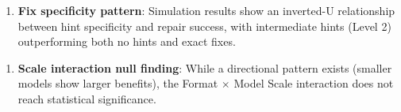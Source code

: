 \begin{enumerate}
\item \textbf{Fix specificity pattern}: Simulation results show an inverted-U relationship between hint specificity and repair success, with intermediate hints (Level 2) outperforming both no hints and exact fixes.
\end{enumerate}

\begin{enumerate}
\item \textbf{Scale interaction null finding}: While a directional pattern exists (smaller models show larger benefits), the Format $\times$ Model Scale interaction does not reach statistical significance.
\end{enumerate}
